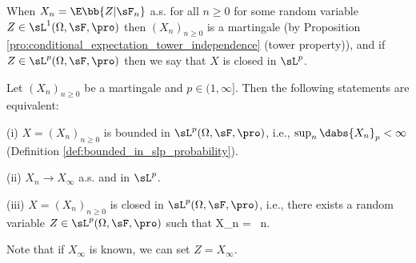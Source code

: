 \begin{definition}\label{def:closed_in_lp_discrete}
When $X_n = \E\bb{Z | \sF_n}$ a.s. for all $n \geq 0$ for some random variable $Z\in \sL^1(\Omega,\sF,\pro)$ then $(X_n)_{n \geq 0}$ is a martingale (by Proposition \ref{pro:conditional_expectation_tower_independence} (tower property)), and if $Z \in \sL^p(\Omega ,\sF,\pro)$ then we say that $X$ is closed in $\sL^p$.
\end{definition}


\begin{theorem}[[$\sL^p$ martingale convergence theorem\index{lp-martingale-convergence@$\sL^p$ martingale convergence theorem!discrete}]\label{thm:martingale_bounded_lp_as_lp_closed_discrete}
Let $(X_n)_{n \geq 0}$ be a martingale and $p \in (1,\infty]$. Then the following statements are equivalent:
\ben
\item [(i)] $X = (X_n)_{n\geq 0}$ is bounded in $\sL^p(\Omega,\sF,\pro)$, i.e., $\sup_n \dabs{X_n}_p <\infty$ (Definition \ref{def:bounded_in_slp_probability}).
\item [(ii)] $X_n \to  X_\infty$ a.s. and in $\sL^p$.
\item [(iii)] $X = (X_n)_{n\geq 0}$ is closed in $\sL^p(\Omega,\sF,\pro)$, i.e., there exists a random variable $Z\in \sL^p(\Omega ,\sF,\pro)$ such that
\be
X_n = \E{}\ n.
\ee

Note that if $X_\infty$ is known, we can set $Z = X_\infty$.
\een
\end{theorem}


